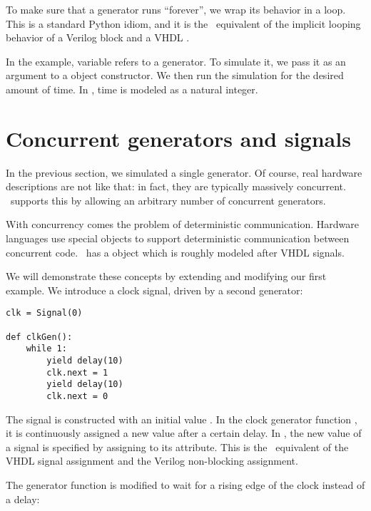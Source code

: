 To make sure that a generator runs ``forever'', we wrap its behavior
in a  loop. This is a standard Python idiom, and it is
the \myhdl\ equivalent of the implicit looping behavior of a 
Verilog  block
and a VHDL .

In the example, variable
 refers to a generator. To simulate it, we pass
it as an argument to a  object constructor.  We then
run the simulation for the desired amount of time. In \myhdl{}, time
is modeled as a natural integer.


\section{Concurrent generators and signals \label{intro-conc}}

In the previous section, we simulated a single generator. Of course,
real hardware descriptions are not like that: in fact, they are
typically massively concurrent. \myhdl\ supports this by allowing an
arbitrary number of concurrent generators. 

With concurrency comes the problem of deterministic
communication. Hardware languages use special objects to
support deterministic communication between concurrent code. \myhdl\
has a  object which is roughly modeled after VHDL
signals.

We will demonstrate these concepts by extending and modifying our
first example. We introduce a clock signal, driven by a second
generator: 

\begin{verbatim}
clk = Signal(0)

def clkGen():
    while 1:
        yield delay(10)
        clk.next = 1
        yield delay(10)
        clk.next = 0
\end{verbatim}

The  signal is constructed with an initial value
. In the clock generator function , it is
continuously assigned a new value after a certain delay. In \myhdl{},
the new value of a signal is specified by assigning to its
 attribute. This is the \myhdl\ equivalent of 
the VHDL signal assignment and the 
Verilog non-blocking assignment.

The  generator function is modified to wait for a
rising edge of the clock instead of a delay:

